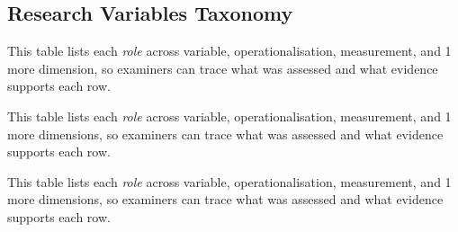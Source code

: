\subsection{Research Variables Taxonomy}


\noindent This table lists each \textit{role} across variable, operationalisation, measurement, and 1 more dimension, so examiners can trace what was assessed and what evidence supports each row.



\noindent This table lists each \textit{role} across variable, operationalisation, measurement, and 1 more dimensions, so examiners can trace what was assessed and what evidence supports each row.


\noindent This table lists each \textit{role} across variable, operationalisation, measurement, and 1 more dimensions, so examiners can trace what was assessed and what evidence supports each row.



